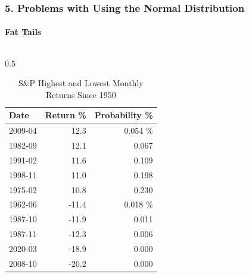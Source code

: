 \documentclass{beamer}
\begin{document}
\begin{frame}[t]
    \frametitle{5. Problems with Using the Normal Distribution}
    \framesubtitle{Fat Tails}

    \vspace{-2em}

    \footnotesize
    \begin{columns}
        \begin{column}{0.5\textwidth}
                \begin{table}
                \caption{S\&P Highest and Lowest Monthly Returns Since 1950}
                \begin{tabular}{lrr}
                \toprule
                Date & Return \% & Probability \% \\
                \midrule
                 2009-04 & 12.3 & 0.054 \% \\
                1982-09 & 12.1 & 0.067 \\
                1991-02 & 11.6 & 0.109 \\
                1998-11 & 11.0 & 0.198 \\
                1975-02 & 10.8 & 0.230 \\
                \midrule
                1962-06 & -11.4 & 0.018 \% \\
                1987-10 & -11.9 & 0.011 \\
                1987-11 & -12.3 & 0.006 \\
                2020-03 & -18.9 & 0.000 \\
                2008-10 & -20.2 & 0.000 \\
                \bottomrule
                \end{tabular}
                \end{table}
        \end{column}


\end{columns}
\end{frame}
\end{document}
